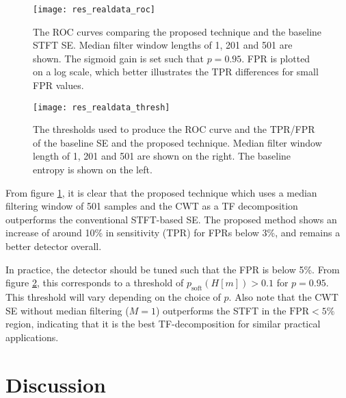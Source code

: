  \begin{figure}[h!]
	\centering
	\texttt{[image: res\_realdata\_roc]}
	\caption[The ROC curves comparing the proposed technique and the baseline STFT SE.]{The ROC curves comparing the proposed technique and the baseline STFT SE. Median filter window lengths of 1, 201 and 501 are shown. The sigmoid gain is set such that $p=0.95$. FPR is plotted on a log scale, which better illustrates the TPR differences for small FPR values.}
	\label{fig:res_realdata_roc}
\end{figure}

 \begin{figure}[h!]
	\centering
	\texttt{[image: res\_realdata\_thresh]}
	\caption[The thresholds used to produce the ROC curve.]{The thresholds used to produce the ROC curve and the TPR/FPR of the baseline SE and the proposed technique. Median filter window length of 1, 201 and 501 are shown on the right. The baseline entropy is shown on the left. }
	\label{fig:res_realdata_thresh}
\end{figure}

From figure \ref{fig:res_realdata_roc}, it is clear that the proposed technique which uses a median filtering window of 501 samples and the CWT as a TF decomposition outperforms the conventional STFT-based SE. The proposed method shows an increase of around 10\% in sensitivity (TPR) for FPRs  below 3\%, and remains a better detector overall. 

In practice, the detector should be tuned such that the FPR is below 5\%. From figure \ref{fig:res_realdata_thresh}, this corresponds to a threshold of $p_\text{soft}(H[m]) > 0.1$ for $p=0.95$. This threshold will vary depending on the choice of $p$. Also note that the CWT SE without median filtering ($M=1$) outperforms the STFT in the $\text{FPR} < 5\%$ region, indicating that it is the best TF-decomposition for similar practical applications.

\section{Discussion}

